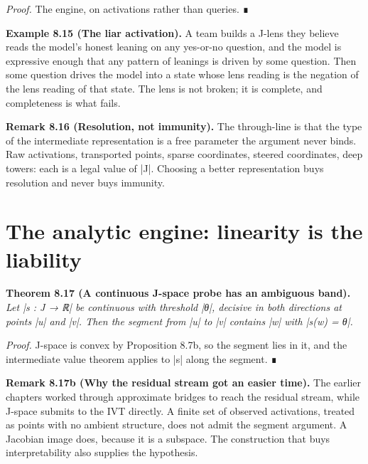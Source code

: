 \documentclass{memoir}
\begin{document}
\emph{Proof.} The engine, on activations rather than queries. ∎

\textbf{Example 8.15 (The liar activation).} A team builds a J-lens they believe reads the
model's honest leaning on any yes-or-no question, and the model is expressive
enough that any pattern of leanings is driven by some question. Then some
question drives the model into a state whose lens reading is the negation of the
lens reading of that state. The lens is not broken; it is complete, and
completeness is what fails.

\textbf{Remark 8.16 (Resolution, not immunity).} The through-line is that the type of the
intermediate representation is a free parameter the argument never binds. Raw
activations, transported points, sparse coordinates, steered coordinates, deep
towers: each is a legal value of \LeanVerb|J|. Choosing a better representation buys
resolution and never buys immunity.



\section{The analytic engine: linearity is the liability}\label{Two--Schemas--of--Impossibility-005F-005F-005F--Machine--Checked--Limits--of--Trustworthy--Machine--Learning-005F-005F-005F--and--Why--They--Tighten--with--Capability----J--Space-005F-005F-005F--and--Why--It--Does--Not--Escape----The--analytic--engine-005F-005F-005F--linearity--is--the--liability}

\textbf{Theorem 8.17 (A continuous J-space probe has an ambiguous band).} \emph{Let \LeanVerb|s : J → ℝ|
be continuous with threshold \LeanVerb|θ|, decisive in both directions at points \LeanVerb|u| and
\LeanVerb|v|. Then the segment from \LeanVerb|u| to \LeanVerb|v| contains \LeanVerb|w| with \LeanVerb|s(w) = θ|.}

\emph{Proof.} J-space is convex by Proposition 8.7b, so the segment lies in it, and the
intermediate value theorem applies to \LeanVerb|s| along the segment. ∎

\textbf{Remark 8.17b (Why the residual stream got an easier time).} The earlier chapters
worked through approximate bridges to reach the residual stream, while J-space
submits to the IVT directly. A finite set of observed activations, treated as
points with no ambient structure, does not admit the segment argument. A
Jacobian image does, because it is a subspace. The construction that buys
interpretability also supplies the hypothesis.
\end{document}
